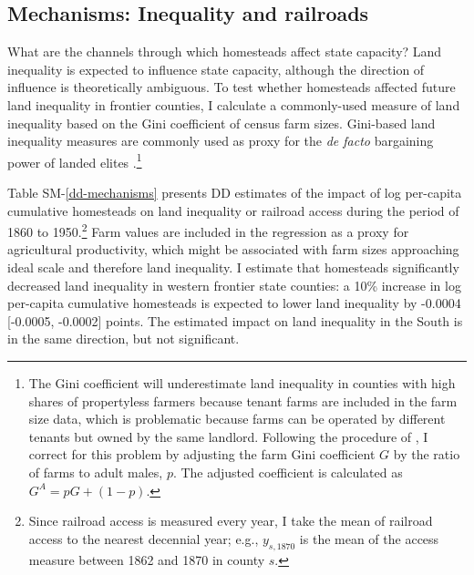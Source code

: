\documentclass[12pt]{article}
\begin{document}
\subsection{Mechanisms: Inequality and railroads}  \label{mechanisms}

What are the channels through which homesteads affect state capacity? Land inequality is expected to influence state capacity, although the direction of influence is theoretically ambiguous. To test whether homesteads affected future land inequality in frontier counties, I calculate a commonly-used measure of land inequality based on the Gini coefficient of census farm sizes. Gini-based land inequality measures are commonly used as proxy for the \emph{de facto} bargaining power of landed elites \citep[e.g.,][]{boix2003democracy,ziblatt2008does,ansell2015}.\footnote{The Gini coefficient will underestimate land inequality in counties with high shares of propertyless farmers because tenant farms are included in the farm size data, which is problematic because farms can be operated by different tenants but owned by the same landlord. Following the procedure of \citet{vollrath2013inequality}, I correct for this problem by adjusting the farm Gini coefficient $G$ by the ratio of farms to adult males, $p$. The adjusted coefficient is calculated as $G^A = p G + (1-p)$.}%

Table SM-\ref{dd-mechanisms} presents DD estimates of the impact of log per-capita cumulative homesteads on land inequality or railroad access during the period of 1860 to 1950.\footnote{Since railroad access is measured every year, I take the mean of railroad access to the nearest decennial year; e.g., $y_{s, 1870}$ is the mean of the access measure between 1862 and 1870 in county $s$.} Farm values are included in the regression as a proxy for agricultural productivity, which might be associated with farm sizes approaching ideal scale and therefore land inequality. I estimate that homesteads significantly decreased land inequality in western frontier state counties: a 10\% increase in log per-capita cumulative homesteads is expected to lower land inequality by -0.0004 [-0.0005, -0.0002] points. The estimated impact on land inequality in the South is in the same direction, but not significant. 
\end{document}
